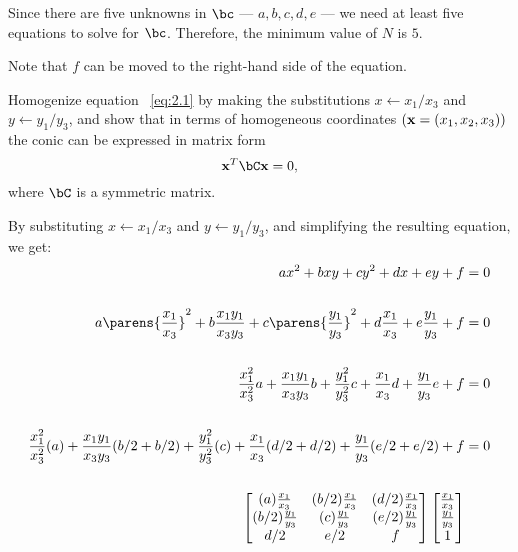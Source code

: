 \begin{problem}
\begin{enumalph}
\begin{answer}
        Since there are five unknowns in $\bc$ ---
        $a, b, c, d, e$ --- we need at least five equations
        to solve for $\bc$.
        Therefore, the minimum value of $N$ is $5$.

        Note that $f$ can
        be moved to the right-hand side of the equation.
      \end{answer}

    \newpage
    \item Homogenize equation ~\ref{eq:2.1} by making the
      substitutions $x \gets x_1/x_3$ and $y \gets y_1/y_3$,
      and show that in terms of homogeneous coordinates
      $(\mathbf{x} = (x_1, x_2, x_3))$ the conic can be expressed in
      matrix form
      \[ \bx^T\bC\bx = 0, \]
      where $\bC$ is a symmetric matrix.
      \begin{answer}
        By substituting $x \gets x_1/x_3$ and $y \gets y_1/y_3$,
        and simplifying the resulting equation, we get:
        \begin{align*}
          ax^2 + bxy + cy^2 + dx + ey + f &= 0 \\ \\
          a\parens{\frac{x_1}{x_3}}^2 + b\frac{x_1y_1}{x_3y_3}
          + c\parens{\frac{y_1}{y_3}}^2
          + d\frac{x_1}{x_3} + e\frac{y_1}{y_3} + f &= 0 \\ \\
          \frac{x_1^2}{x_3^2}a + \frac{x_1y_1}{x_3y_3}b
          + \frac{y_1^2}{y_3^2}c
          + \frac{x_1}{x_3}d + \frac{y_1}{y_3}e + f &= 0 \\ \\
          \frac{x_1^2}{x_3^2}(a) + \frac{x_1y_1}{x_3y_3}(b/2 + b/2)
          + \frac{y_1^2}{y_3^2}(c) + \frac{x_1}{x_3}(d/2 + d/2)
          + \frac{y_1}{y_3}(e/2 + e/2) + f &= 0 \\ \\
          \begin{bmatrix}
            (a) \frac{x_1}{x_3} & (b/2) \frac{x_1}{x_3} & (d/2) \frac{x_1}{x_3} \\
            (b/2) \frac{y_1}{y_3} & (c) \frac{y_1}{y_3} & (e/2) \frac{y_1}{y_3} \\
            d/2 & e/2 & f \\
          \end{bmatrix}
          \begin{bmatrix}
            \frac{x_1}{x_3} \\
            \frac{y_1}{y_3} \\
            1 \\

\end{bmatrix}
\end{align*}
\end{answer}
\end{enumalph}
\end{problem}
